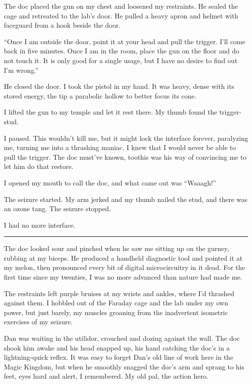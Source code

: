 The doc placed the gun on my chest and loosened my restraints. He
sealed the cage and retreated to the lab's door. He pulled a heavy
apron and helmet with faceguard from a hook beside the door.

“Once I am outside the door, point it at your head and pull the
trigger. I'll come back in five minutes. Once I am in the room,
place the gun on the floor and do not touch it. It is only good for
a single usage, but I have no desire to find out I'm wrong.”

He closed the door. I took the pistol in my hand. It was heavy,
dense with its stored energy, the tip a parabolic hollow to better
focus its cone.

I lifted the gun to my temple and let it rest there. My thumb found
the trigger-stud.

I paused. This wouldn't kill me, but it might lock the interface
forever, paralyzing me, turning me into a thrashing maniac. I knew
that I would never be able to pull the trigger. The doc must've
known, too{\dash}this was his way of convincing me to let him do that
restore.

I opened my mouth to call the doc, and what came out was “Waaagh!”

The seizure started. My arm jerked and my thumb nailed the stud,
and there was an ozone tang. The seizure stopped.

I had no more interface.

\begin{center}\rule{1in}{0.4pt}\end{center}

The doc looked sour and pinched when he saw me sitting up on the
gurney, rubbing at my biceps. He produced a handheld diagnostic
tool and pointed it at my melon, then pronounced every bit of
digital microcircuitry in it dead. For the first time since my
twenties, I was no more advanced than nature had made me.

The restraints left purple bruises at my wrists and ankles, where
I'd thrashed against them. I hobbled out of the Faraday cage and
the lab under my own power, but just barely, my muscles groaning
from the inadvertent isometric exercises of my seizure.

Dan was waiting in the utilidor, crouched and dozing against the
wall. The doc shook him awake and his head snapped up, his hand
catching the doc's in a lightning-quick reflex. It was easy to
forget Dan's old line of work here in the Magic Kingdom, but when
he smoothly snagged the doc's arm and sprang to his feet, eyes hard
and alert, I remembered. My old pal, the action hero.

